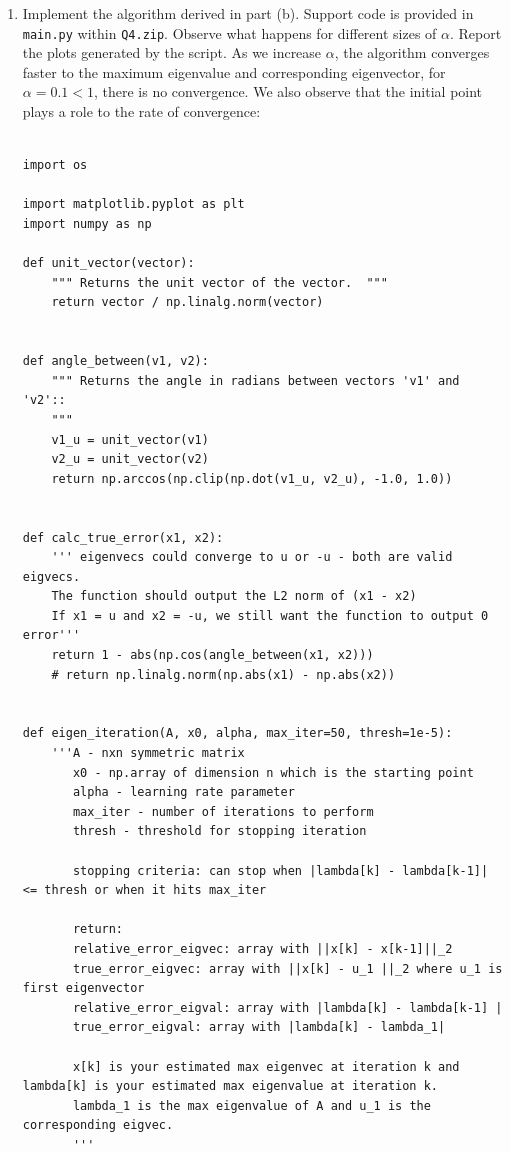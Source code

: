 \documentclass[12pt,twoside]{article}
\begin{document}
\begin{enumerate}
\begin{enumerate}
\item Implement the algorithm derived in part (b). Support code is provided in {\tt main.py} within {\tt Q4.zip}. Observe what happens for different sizes of $\alpha$. Report the plots generated by the script.
As we increase $\alpha$, the algorithm converges faster to the maximum eigenvalue and corresponding eigenvector, for $\alpha=0.1 < 1$, there is no convergence.
We also observe that the initial point plays a role to the rate of convergence:

\begin{verbatim}

import os

import matplotlib.pyplot as plt
import numpy as np

def unit_vector(vector):
    """ Returns the unit vector of the vector.  """
    return vector / np.linalg.norm(vector)


def angle_between(v1, v2):
    """ Returns the angle in radians between vectors 'v1' and 'v2'::
    """
    v1_u = unit_vector(v1)
    v2_u = unit_vector(v2)
    return np.arccos(np.clip(np.dot(v1_u, v2_u), -1.0, 1.0))


def calc_true_error(x1, x2):
    ''' eigenvecs could converge to u or -u - both are valid eigvecs.
    The function should output the L2 norm of (x1 - x2)
    If x1 = u and x2 = -u, we still want the function to output 0 error'''
    return 1 - abs(np.cos(angle_between(x1, x2)))
    # return np.linalg.norm(np.abs(x1) - np.abs(x2))


def eigen_iteration(A, x0, alpha, max_iter=50, thresh=1e-5):
    '''A - nxn symmetric matrix
       x0 - np.array of dimension n which is the starting point
       alpha - learning rate parameter
       max_iter - number of iterations to perform
       thresh - threshold for stopping iteration

       stopping criteria: can stop when |lambda[k] - lambda[k-1]| <= thresh or when it hits max_iter

       return:
       relative_error_eigvec: array with ||x[k] - x[k-1]||_2
       true_error_eigvec: array with ||x[k] - u_1 ||_2 where u_1 is first eigenvector
       relative_error_eigval: array with |lambda[k] - lambda[k-1] |
       true_error_eigval: array with |lambda[k] - lambda_1|

       x[k] is your estimated max eigenvec at iteration k and lambda[k] is your estimated max eigenvalue at iteration k.
       lambda_1 is the max eigenvalue of A and u_1 is the corresponding eigvec.
       '''


\end{verbatim}
\end{enumerate}
\end{enumerate}
\end{document}
